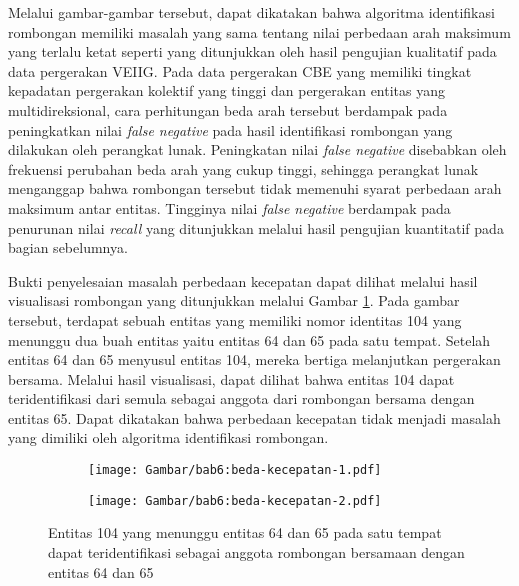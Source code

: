 Melalui gambar-gambar tersebut, dapat dikatakan bahwa algoritma identifikasi rombongan memiliki masalah yang sama tentang nilai perbedaan arah maksimum yang terlalu ketat seperti yang ditunjukkan oleh hasil pengujian kualitatif pada data pergerakan VEIIG. Pada data pergerakan CBE yang memiliki tingkat kepadatan pergerakan kolektif yang tinggi dan pergerakan entitas yang multidireksional, cara perhitungan beda arah tersebut berdampak pada peningkatkan nilai \textit{false negative} pada hasil identifikasi rombongan yang dilakukan oleh perangkat lunak. Peningkatan nilai \textit{false negative} disebabkan oleh frekuensi perubahan beda arah yang cukup tinggi, sehingga perangkat lunak menganggap bahwa rombongan tersebut tidak memenuhi syarat perbedaan arah maksimum antar entitas. Tingginya nilai \textit{false negative} berdampak pada penurunan nilai \textit{recall} yang ditunjukkan melalui hasil pengujian kuantitatif pada bagian sebelumnya.

Bukti penyelesaian masalah perbedaan kecepatan dapat dilihat melalui hasil visualisasi rombongan yang ditunjukkan melalui Gambar \ref{bab6:solusi-beda-kecepatan}. Pada gambar tersebut, terdapat sebuah entitas yang memiliki nomor identitas 104 yang menunggu dua buah entitas yaitu entitas 64 dan 65 pada satu tempat. Setelah entitas 64 dan 65 menyusul entitas 104, mereka bertiga melanjutkan pergerakan bersama. Melalui hasil visualisasi, dapat dilihat bahwa entitas 104 dapat teridentifikasi dari semula sebagai anggota dari rombongan bersama dengan entitas 65. Dapat dikatakan bahwa perbedaan kecepatan tidak menjadi masalah yang dimiliki oleh algoritma identifikasi rombongan.

\begin{figure}[h]
    \centering
    \captionsetup{width=.85\textwidth}
    \begin{subfigure}[h]{0.425\textwidth}
        \centering
        \texttt{[image: Gambar/bab6:beda-kecepatan-1.pdf]}
    \end{subfigure}
    \begin{subfigure}[h]{0.45\textwidth}
        \centering
        \texttt{[image: Gambar/bab6:beda-kecepatan-2.pdf]}
    \end{subfigure}
    \caption[Penyelesaian masalah beda kecepatan pada data CBE]{Entitas 104 yang menunggu entitas 64 dan 65 pada satu tempat dapat teridentifikasi sebagai anggota rombongan bersamaan dengan entitas 64 dan 65}
    \label{bab6:solusi-beda-kecepatan}
\end{figure}
